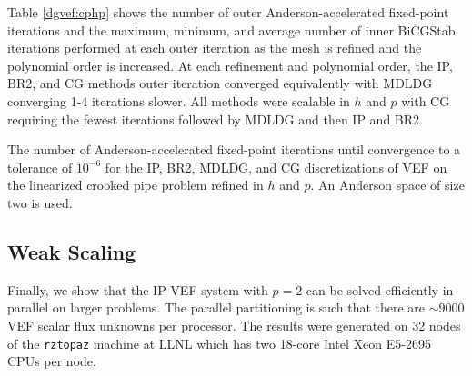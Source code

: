\documentclass[../doc.tex]{subfiles}
\begin{document}
Table \ref{dgvef:cphp} shows the number of outer Anderson-accelerated fixed-point iterations and the maximum, minimum, and average number of inner BiCGStab iterations performed at each outer iteration as the mesh is refined and the polynomial order is increased. At each refinement and polynomial order, the IP, BR2, and CG methods outer iteration converged equivalently with MDLDG converging 1-4 iterations slower. All methods were scalable in $h$ and $p$ with CG requiring the fewest iterations followed by MDLDG and then IP and BR2. 
\begin{table}
\centering
\caption{The number of Anderson-accelerated fixed-point iterations until convergence to a tolerance of $10^{-6}$ for the IP, BR2, MDLDG, and CG discretizations of VEF on the linearized crooked pipe problem refined in $h$ and $p$. An Anderson space of size two is used.}
\label{dgvef:cphp}
\begin{adjustbox}{max width = \textwidth}

\end{adjustbox}
\end{table}

\subsection{Weak Scaling}
Finally, we show that the IP VEF system with $p=2$ can be solved efficiently in parallel on larger problems. The parallel partitioning is such that there are $\sim\!9000$ VEF scalar flux unknowns per processor. The results were generated on 32 nodes of the \texttt{rztopaz} machine at LLNL which has two 18-core Intel Xeon E5-2695 CPUs per node. 
\end{document}
